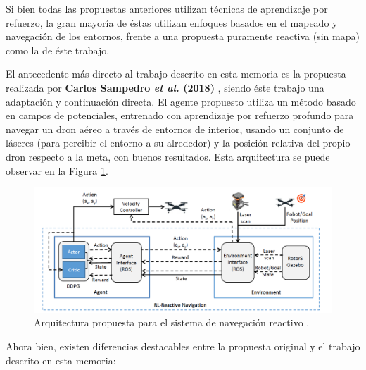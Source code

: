 Si bien todas las propuestas anteriores utilizan técnicas de aprendizaje por refuerzo, la gran mayoría de éstas utilizan enfoques basados en el mapeado y navegación de los entornos, frente a una propuesta puramente reactiva (sin mapa) como la de éste trabajo.

El antecedente más directo al trabajo descrito en esta memoria es la propuesta realizada por \textbf{Carlos Sampedro \textit{et al.} (2018)} \cite{Sampedro2018}, siendo éste trabajo una adaptación y continuación directa. El agente propuesto utiliza un método basado en campos de potenciales, entrenado con aprendizaje por refuerzo profundo para navegar un dron aéreo a través de entornos de interior, usando un conjunto de láseres (para percibir el entorno a su alrededor) y la posición relativa del propio dron respecto a la meta, con buenos resultados. Esta arquitectura se puede observar en la Figura \ref{fig:chap2-drone}.

\begin{figure}[h]
    \centering
    \includegraphics[width=\textwidth]{imagenes/cap2/drone-architecture.png}
    \caption{Arquitectura propuesta para el sistema de navegación reactivo \cite{Sampedro2018}.}
    \label{fig:chap2-drone}
\end{figure}

Ahora bien, existen diferencias destacables entre la propuesta original y el trabajo descrito en esta memoria:

